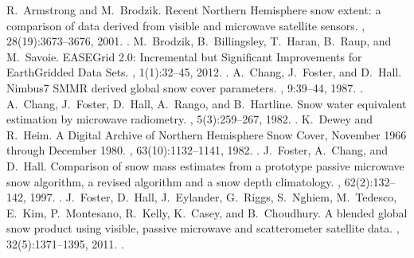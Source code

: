 \documentclass[letterpaper,10pt,english]{jupyterBook}
\begin{document}
\begin{sphinxthebibliography}{10}
\sphinxAtStartPar
R. Armstrong and M. Brodzik. Recent Northern Hemisphere snow extent: a comparison of data derived from visible and microwave satellite sensors. , 28(19):3673–3676, 2001. .
\sphinxAtStartPar
M. Brodzik, B. Billingsley, T. Haran, B. Raup, and M. Savoie. EASE\sphinxhyphen{}Grid 2.0: Incremental but Significant Improvements for Earth\sphinxhyphen{}Gridded Data Sets. , 1(1):32–45, 2012. .
\sphinxAtStartPar
A. Chang, J. Foster, and D. Hall. Nimbus\sphinxhyphen{}7 SMMR derived global snow cover parameters. , 9:39–44, 1987. .
\sphinxAtStartPar
A. Chang, J. Foster, D. Hall, A. Rango, and B. Hartline. Snow water equivalent estimation by microwave radiometry. , 5(3):259–267, 1982. .
\sphinxAtStartPar
K. Dewey and R. Heim. A Digital Archive of Northern Hemisphere Snow Cover, November 1966 through December 1980. , 63(10):1132–1141, 1982. .
\sphinxAtStartPar
J. Foster, A. Chang, and D. Hall. Comparison of snow mass estimates from a prototype passive microwave snow algorithm, a revised algorithm and a snow depth climatology. , 62(2):132–142, 1997. .
\sphinxAtStartPar
J. Foster, D. Hall, J. Eylander, G. Riggs, S. Nghiem, M. Tedesco, E. Kim, P. Montesano, R. Kelly, K. Casey, and B. Choudhury. A blended global snow product using visible, passive microwave and scatterometer satellite data. , 32(5):1371–1395, 2011. .

\end{sphinxthebibliography}
\end{document}
